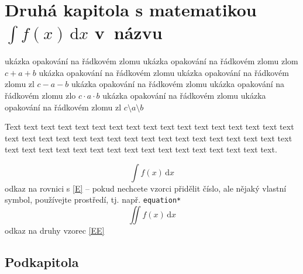 \chapter{Druhá kapitola s matematikou \texorpdfstring{$\int\! f(x)\,\mathrm{d}x$}{int f(x) dx} v~názvu}

% 
 ukázka opakování na řádkovém zlomu ukázka opakování na řádkovém zlomu zlom $c+ a+ b$
% 
 ukázka opakování na řádkovém zlomu ukázka opakování na řádkovém zlomu zl $c- a- b$
% 
 ukázka opakování na řádkovém zlomu ukázka opakování na řádkovém zlomu zlo $c\cdot a\cdot b$
% 
 ukázka opakování na řádkovém zlomu ukázka opakování na řádkovém zlomu zl $c\setminus a\setminus b$
% 

Text text  text  text  text  text  text  text  text  text  text  text  text  text  text  text  text  text  text  text 
text  text  text  text  text  text  text  text  text  text  text  text  text  text  text  text  text  text  text  text 
text  text  text  text  text  text  text  text  text  text.

\begin{equation*}\label{E}\tag{rovnice}
 \int\! f(x)\,\mathrm{d}x
\end{equation*}
odkaz na rovnici s  \eqref{E} -- pokud nechcete vzorci přidělit číslo, ale nějaký vlastní symbol, používejte
 prostředí, tj. např. \verb+equation*+
\begin{equation}\label{EE}
 \iint\! f(x)\,\mathrm{d}x
\end{equation}
odkaz na druhy vzorec \eqref{EE}

\lipsum[1]

\shorthandoff{-} 
\lipsum[9-14]
\lipsum[35-41]

\section{Podkapitola}

\lipsum[50-53]
\shorthandon{-} 

